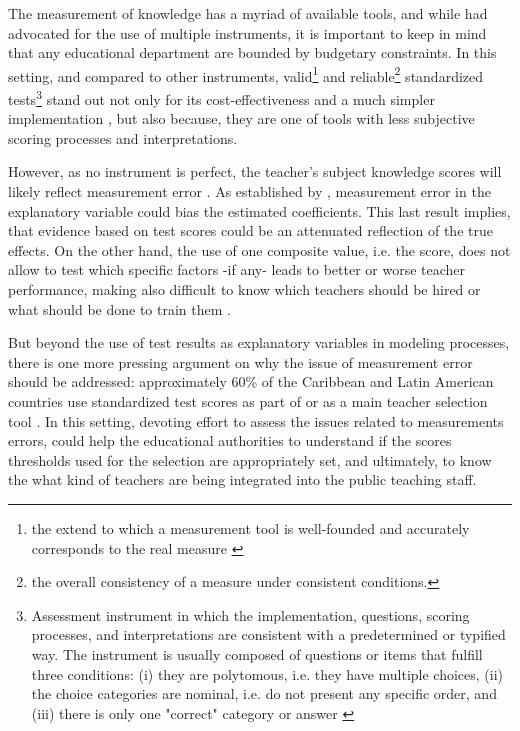 The measurement of knowledge has a myriad of available tools, and while \citet{Bertoni_et_al_2020b} had advocated for the use of multiple instruments, it is important to keep in mind that any educational department are bounded by budgetary constraints. In this setting, and compared to other instruments, valid\footnote{the extend to which a measurement tool is well-founded and accurately corresponds to the real measure \citep{Kelley_1927}} and reliable\footnote{the overall consistency of a measure under consistent conditions.} standardized tests\footnote{Assessment instrument in which the implementation, questions, scoring processes, and interpretations are consistent with a predetermined or typified way. The instrument is usually composed of questions or items that fulfill three conditions: (i) they are polytomous, i.e. they have multiple choices, (ii) the choice categories are nominal, i.e. do not present any specific order, and (iii) there is only one "correct" category or answer \citep{Rivera_2019}} stand out not only for its cost-effectiveness and a much simpler implementation \citep{Hincapie_et_al_2020}, but also because, they are one of tools with less subjective scoring processes and interpretations.

However, as no instrument is perfect, the teacher's subject knowledge scores will likely reflect measurement error \citep{Metzler_et_al_2012}. As established by \citet{Angrist_et_al_1999}, measurement error in the explanatory variable could bias the estimated coefficients. This last result implies, that evidence based on test scores could be an attenuated reflection of the true effects. On the other hand, the use of one composite value, i.e. the score, does not allow to test which specific factors -if any- leads to better or worse teacher performance, making also difficult to know which teachers should be hired or what should be done to train them \citep{Hanushek_et_al_2012}.

But beyond the use of test results as explanatory variables in modeling processes, there is one more pressing argument on why the issue of measurement error should be addressed: approximately 60\% of the Caribbean and Latin American countries use standardized test scores as part of or as a main teacher selection tool \citep{Hincapie_et_al_2020}. In this setting, devoting effort to assess the issues related to measurements errors, could help the educational authorities to understand if the scores thresholds used for the selection are appropriately set, and ultimately, to know the what kind of teachers are being integrated into the public teaching staff.

